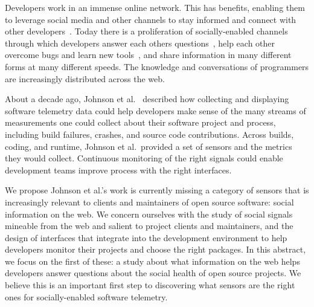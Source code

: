Developers work in an immense online network.
This has benefits, enabling them to leverage social media and other channels to stay informed and connect with other developers~\cite{singer_software_2014,storey_how_2016}.
Today there is a proliferation of socially-enabled channels~\cite{storey_revolution_2014} through which developers answer each others questions~\cite{mamykina_fastest_2011}, help each other overcome bugs and learn new tools~\cite{parnin_blogging_2013}, and share information in many different forms at many different speeds.
The knowledge and conversations of programmers are increasingly distributed across the web.

About a decade ago, Johnson et al.~\cite{johnson_improving_2005} described how collecting and displaying software telemetry data could help developers make sense of the many streams of measurements one could collect about their software project and process, including build failures, crashes, and source code contributions.
Across builds, coding, and runtime, Johnson et al.\ provided a set of sensors and the metrics they would collect.
Continuous monitoring of the right signals could enable development teams improve process with the right interfaces.

We propose Johnson et al.'s work is currently missing a category of sensors that is increasingly relevant to clients and maintainers of open source software:
social information on the web.
We concern ourselves with the study of social signals mineable from the web and salient to project clients and maintainers, and the design of interfaces that integrate into the development environment to help developers monitor their projects and choose the right packages.
In this abstract, we focus on the first of these:
a study about what information on the web helps developers answer questions about the social health of open source projects.
We believe this is an important first step to discovering what sensors are the right ones for socially-enabled software telemetry.

